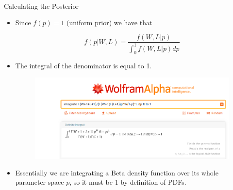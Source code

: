 \documentclass[handout]{beamer}
\begin{document}
\begin{frame}{Calculating the Posterior}
\scriptsize{

\begin{itemize}


\item Since $f(p)=1$ (uniform prior) we have that

\begin{displaymath}
f(p|W,L) = \frac{f(W,L|p)}{\int_0^1f(W,L|p)dp} 
\end{displaymath}

\item The integral of the denominator is equal to 1.



\begin{figure}[h!]
	\centering
	\includegraphics[scale=0.25]{pics/wolfram.png}
\end{figure}

\item Essentially we are integrating a Beta density function over its whole parameter space $p$, so it must be 1 by definition of PDFs.


\end{itemize}

} 

\end{frame}
\end{document}

